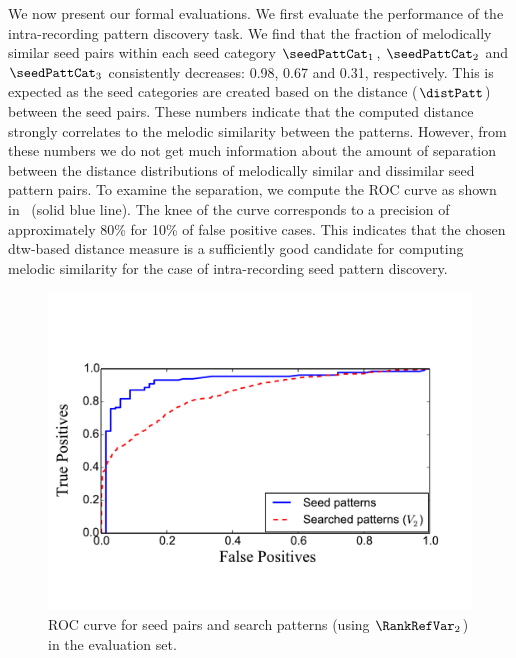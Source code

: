 We now present our formal evaluations. We first evaluate the performance of the intra-recording pattern discovery task. We find that the fraction of melodically similar seed pairs within each seed category $\seedPattCat_1$, $\seedPattCat_2$ and $\seedPattCat_3$ consistently decreases: 0.98, 0.67 and 0.31, respectively. This is expected as the seed categories are created based on the distance ($\distPatt$) between the seed pairs. These numbers indicate that the computed distance strongly correlates to the melodic similarity between the patterns. However, from these numbers we do not get much information about the amount of separation between the distance distributions of melodically similar and dissimilar seed pattern pairs. To examine the separation, we compute the ROC curve as shown in~ (solid blue line). The knee of the curve corresponds to a precision of approximately 80\% for 10\% of false positive cases. This indicates that the chosen \gls{dtw}-based distance measure is a sufficiently good candidate for computing melodic similarity for the case of intra-recording seed pattern discovery. 


\begin{figure}
	\begin{center}
		\includegraphics[width=\figSizeEightyFive]{ch06_patterns/figures/discovery/seedROC.pdf}
	\end{center}
	\caption[ROC curve for seed pairs and search patterns]{ROC curve for seed pairs and search patterns (using $\RankRefVar_2$) in the evaluation set.}%
	\label{fig:combinedROCPatternDiscovery}
\end{figure}



